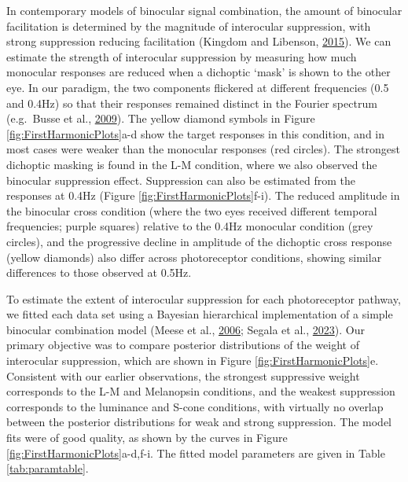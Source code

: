 \documentclass[
]{article}
\begin{document}
In contemporary models of binocular signal combination, the amount of binocular facilitation is determined by the magnitude of interocular suppression, with strong suppression reducing facilitation (Kingdom and Libenson, \protect\hyperlink{ref-Kingdom2015}{2015}). We can estimate the strength of interocular suppression by measuring how much monocular responses are reduced when a dichoptic `mask' is shown to the other eye. In our paradigm, the two components flickered at different frequencies (0.5 and 0.4Hz) so that their responses remained distinct in the Fourier spectrum (e.g.~Busse et al., \protect\hyperlink{ref-Busse2009}{2009}). The yellow diamond symbols in Figure \ref{fig:FirstHarmonicPlots}a-d show the target responses in this condition, and in most cases were weaker than the monocular responses (red circles). The strongest dichoptic masking is found in the L-M condition, where we also observed the binocular suppression effect. Suppression can also be estimated from the responses at 0.4Hz (Figure \ref{fig:FirstHarmonicPlots}f-i). The reduced amplitude in the binocular cross condition (where the two eyes received different temporal frequencies; purple squares) relative to the 0.4Hz monocular condition (grey circles), and the progressive decline in amplitude of the dichoptic cross response (yellow diamonds) also differ across photoreceptor conditions, showing similar differences to those observed at 0.5Hz.

To estimate the extent of interocular suppression for each photoreceptor pathway, we fitted each data set using a Bayesian hierarchical implementation of a simple binocular combination model (Meese et al., \protect\hyperlink{ref-Meese2006}{2006}; Segala et al., \protect\hyperlink{ref-Segala2023}{2023}). Our primary objective was to compare posterior distributions of the weight of interocular suppression, which are shown in Figure \ref{fig:FirstHarmonicPlots}e. Consistent with our earlier observations, the strongest suppressive weight corresponds to the L-M and Melanopsin conditions, and the weakest suppression corresponds to the luminance and S-cone conditions, with virtually no overlap between the posterior distributions for weak and strong suppression. The model fits were of good quality, as shown by the curves in Figure \ref{fig:FirstHarmonicPlots}a-d,f-i. The fitted model parameters are given in Table \ref{tab:paramtable}.
\end{document}
